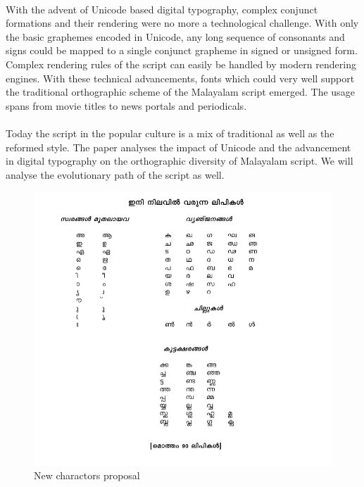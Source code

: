 \documentclass[10pt]{article}
\begin{document}
\paragraph{}
With the advent of Unicode based digital typography, complex conjunct formations and their rendering were no more a technological challenge. With only the basic graphemes  encoded in Unicode, any long sequence of consonants and signs could be mapped to a single conjunct grapheme in signed or unsigned form.  Complex rendering rules of the script can easily be handled by modern rendering engines. With these technical advancements, fonts which could very well support the traditional orthographic scheme of the Malayalam script emerged. The usage spans from movie titles to news portals and periodicals.

\paragraph{}
Today the script in the popular culture is a mix of traditional as well as the reformed style. The paper analyses the impact of Unicode and the advancement in digital typography on the orthographic diversity of Malayalam script. We will analyse the evolutionary path of the script as well.










\begin{figure}
  \centering
   \includegraphics[width=1.0\textwidth]{images/1971-new-lipi.png}
  \caption{New charactors proposal}
\end{figure}
\end{document}

